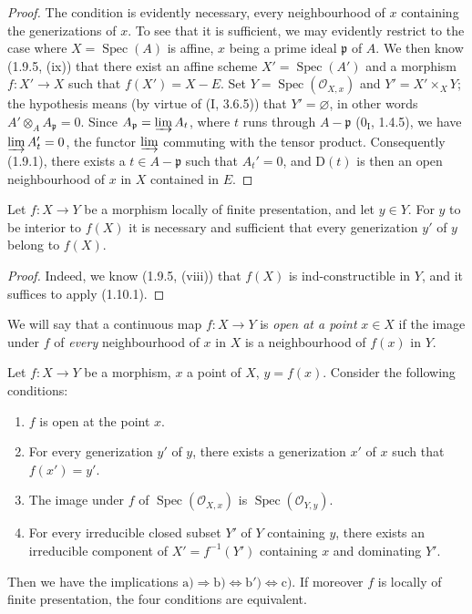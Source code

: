 \begin{proof}
The condition is evidently necessary, every neighbourhood of $x$ containing
the generizations of $x$. To see that it is sufficient, we may evidently
restrict to the case where $X=\operatorname{Spec}(A)$ is affine, $x$ being a prime ideal
$\mathfrak p$ of $A$. We then know (1.9.5, (ix)) that there exist an affine
scheme $X'=\operatorname{Spec}(A')$ and a morphism $f:X'\to X$ such that
$f(X')=X-E$. Set $Y=\operatorname{Spec}(\mathcal O_{X,x})$ and
$Y'=X'\times_XY$; the hypothesis means (by
virtue of (I, 3.6.5)) that $Y'=\varnothing$, in other words
$A'\otimes_AA_{\mathfrak p}=0$. Since
$A_{\mathfrak p}=\varinjlim A_t$, where $t$ runs through $A-\mathfrak p$
($0_{\mathrm I}$, 1.4.5), we have $\varinjlim A_t'=0$, the functor
$\varinjlim$ commuting with the tensor product. Consequently (1.9.1), there
exists a $t\in A-\mathfrak p$ such that $A_t'=0$, and $\mathrm D(t)$ is then
an open neighbourhood of $x$ in $X$ contained in $E$.
\end{proof}

\begin{corollary}[1.10.2]
\label{IV.1.10.2}
Let $f:X\to Y$ be a morphism locally of finite presentation, and let
$y\in Y$. For $y$ to be interior to $f(X)$ it is necessary and sufficient that
every generization $y'$ of $y$ belong to $f(X)$.
\end{corollary}

\begin{proof}
Indeed, we know (1.9.5, (viii)) that $f(X)$ is ind-constructible in $Y$, and
it suffices to apply (1.10.1).
\end{proof}

We will say that a continuous map $f:X\to Y$ is \emph{open at a
point} $x\in X$ if the image under $f$ of \emph{every} neighbourhood of $x$
in $X$ is a neighbourhood of $f(x)$ in $Y$.

\begin{proposition}[1.10.3]\label{IV.1.10.3}
Let $f:X\to Y$ be a morphism, $x$ a point of $X$, $y=f(x)$. Consider
the following conditions:
\begin{enumerate}
  \item[a)] $f$ is open at the point $x$.
  \item[b)] For every generization $y'$ of $y$, there exists a generization
  $x'$ of $x$ such that $f(x')=y'$.
  \item[b')] The image under $f$ of $\operatorname{Spec}(\mathcal O_{X,x})$ is
  $\operatorname{Spec}(\mathcal O_{Y,y})$.
  \item[c)] For every irreducible closed subset $Y'$ of $Y$ containing $y$,
  there exists an irreducible component of $X'=f^{-1}(Y')$ containing $x$ and
  dominating $Y'$.
\end{enumerate}
Then we have the implications
$\mathrm{a)}\Rightarrow\mathrm{b)}\Leftrightarrow\mathrm{b')}
\Leftrightarrow\mathrm{c)}$. If moreover $f$ is locally of finite
presentation, the four conditions are equivalent.
\end{proposition}

